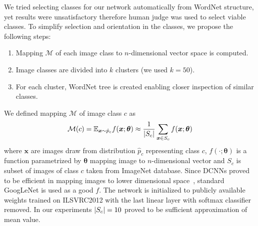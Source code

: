 We tried selecting classes for our network automatically from WordNet structure, yet results were unsatisfactory therefore human judge was used to select viable classes. To simplify selection and orientation in the classes, we propose the following steps:
\begin{enumerate}
	\item Mapping $\mathcal{M}$ of each image class to $n$-dimensional vector space is computed.
	\item Image classes are divided into $k$ clusters (we used $k=50$).
	\item For each cluster, WordNet tree is created enabling closer inspection of similar classes.
\end{enumerate}
We defined mapping $\mathcal{M}$ of image class $c$ as
\begin{equation}
\mathcal{M}(c)=\mathbb{E}_{\bm{x}\sim \hat{p}_{c}}f(\bm{x};\bm{\theta})\approx\frac{1}{\left|{S_c}\right|}\sum_{\bm{x}\in S_c}f(\bm{x};\bm{\theta})
\end{equation}
where $\bm{x}$ are images draw from distribution $\hat{p}_{c}$ representing class $c$, $f(\cdot;\bm{\theta})$ is a function parametrized by $\bm{\theta}$ mapping image to $n$-dimensional vector and $S_c$ is subset of images of class $c$ taken from ImageNet database. Since DCNNs proved to be efficient in mapping images to lower dimensional space~\cite{donahue2014decaf}, standard GoogLeNet is used as a good $f$. The network is initialized to publicly available weights \cite{TFmodels} trained on ILSVRC2012 with the last linear layer with softmax classifier removed. In our experiments $\left|{S_c}\right|=10$ proved to be sufficient approximation of mean value.

